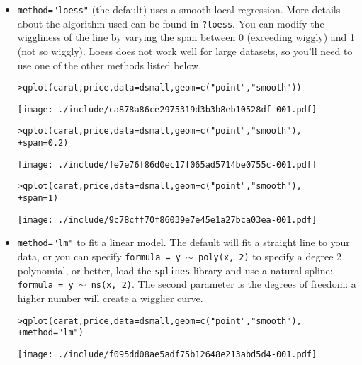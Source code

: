 \begin{itemize}
	\item {\tt method="loess"} (the default) uses a smooth local regression.  More details about the algorithm used can be found in {\tt ?loess}.  You can modify the wiggliness of the line by varying the span between 0 (exceeding wiggly) and 1 (not so wiggly).  Loess does not work well for large datasets, so you'll need to use one of the other methods listed below.

\begin{alltt}
> qplot(carat, price, data = dsmall, geom = c("point", "smooth"))
\end{alltt}
\texttt{[image: ./include/ca878a86ce2975319d3b3b8eb10528df-001.pdf]}
\begin{alltt}

> qplot(carat, price, data = dsmall, geom = c("point", "smooth"), 
+     span = 0.2)
\end{alltt}
\texttt{[image: ./include/fe7e76f86d0ec17f065ad5714be0755c-001.pdf]}
\begin{alltt}

> qplot(carat, price, data = dsmall, geom = c("point", "smooth"), 
+     span = 1)
\end{alltt}
\texttt{[image: ./include/9c78cff70f86039e7e45e1a27bca03ea-001.pdf]}
\begin{alltt}

\end{alltt}

	\item {\tt method="lm"} to fit a linear model.  The default will fit a straight line to your data, or you can specify {\tt formula = y $\sim$ poly(x, 2)} to specify a degree 2 polynomial, or better, load the {\tt splines} library and use a natural spline: {\tt formula = y $\sim$ ns(x, 2)}.  The second parameter is the degrees of freedom: a higher number will create a wigglier curve.

\begin{alltt}
> qplot(carat, price, data = dsmall, geom = c("point", "smooth"), 
+     method = "lm")
\end{alltt}
\texttt{[image: ./include/f095dd08ae5adf75b12648e213abd5d4-001.pdf]}
\begin{alltt}


\end{alltt}
\end{itemize}
